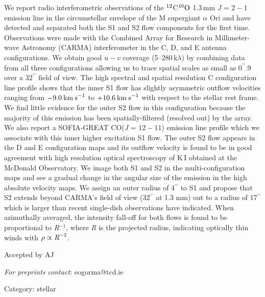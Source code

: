 {We report radio interferometric observations of the $\rm{{}^{12}}$C$\rm{{}^{16}}O$ 1.3\,mm \textit{J} = $2-1$ emission line in the circumstellar envelope of the M supergiant $\alpha$ Ori and have detected and separated both the S1 and S2 flow components for the first time. Observations were made with the Combined Array for Research in Millimeter-wave Astronomy (CARMA) interferometer in the C, D, and E antenna configurations. We obtain good $u-v$ coverage (5--280\,k$\lambda$) by combining data from all three configurations allowing us to trace spatial scales as small as $0^{\prime\prime}.9$ over a $32^{\prime\prime}$ field of view. The high spectral and spatial resolution C configuration line profile shows that the inner S1 flow has slightly asymmetric outflow velocities ranging from $-9.0\>{\rm km\>s}^{-1}$ to $+10.6\>{\rm km\>s}^{-1}$ with respect to the stellar rest frame. We find little evidence  for the outer S2 flow in this configuration because the majority of this emission has been spatially-filtered (resolved out) by the array. We also report a SOFIA-GREAT CO(\textit{J} = $12-11$) emission line profile which we associate with this inner higher excitation S1 flow. The outer S2 flow appears in the D and E configuration maps and its outflow velocity is found to be in good agreement with high resolution optical spectroscopy of K\,I obtained at the McDonald Observatory. We image both S1 and S2 in the multi-configuration maps and see a gradual change in the angular size of the emission in the high absolute velocity maps. We assign an outer radius of 4$^{\prime\prime}$ to S1 and propose that S2 extends beyond CARMA's field of view (32$^{\prime\prime}$ at 1.3 mm) out to a radius of 17$^{\prime\prime}$ which is larger than recent single-dish observations have indicated. When azimuthally averaged, the intensity fall-off for both flows is found to be proportional to \textit{R}$^{-1}$, where \textit{R} is the projected radius, indicating optically thin winds with $\rm{\rho \propto \textit{R}^{-2}}$.}

{ Accepted by AJ }

{{\em For preprints contact}: eogorma@tcd.ie}


{ Category: stellar }
%



